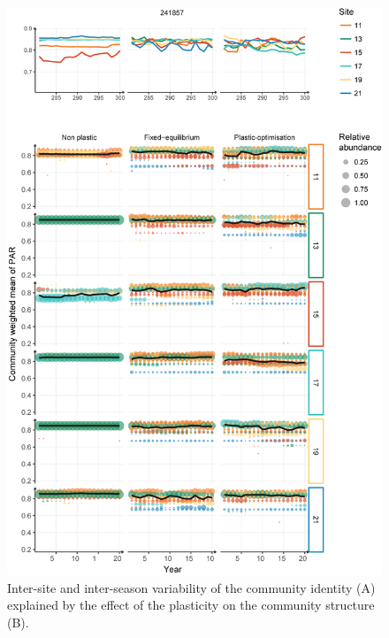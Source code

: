 \begin{figure}\label{fig:explain_strat}
\includegraphics[]{./2_PP/Figures/Comm/explain_par_variability.png}
\caption[Effect of the community structure on the inter-site variability of the community identity.]{Inter-site and inter-season variability of the community identity (A) explained by the effect of the plasticity on the community structure (B).}
\end{figure}



